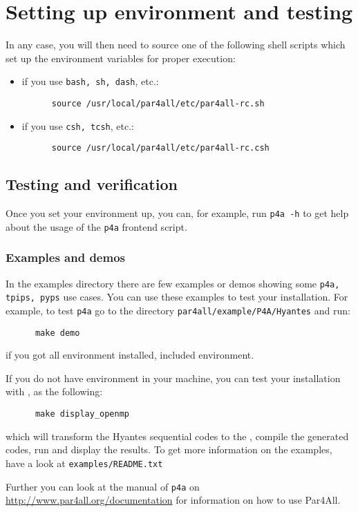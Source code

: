 \documentclass[a4paper]{article}
\begin{document}
\section{Setting up environment and testing \protect\Apfa}
\label{sec:testing}

In any case, you will then need to source one of the following shell
scripts which set up the environment variables for proper \Apfa
execution:
\begin{itemize}
\item if you use \texttt{bash, sh, dash}, etc.:
\begin{verbatim}
      source /usr/local/par4all/etc/par4all-rc.sh
\end{verbatim}
\item if you use \texttt{csh, tcsh}, etc.:
\begin{verbatim}
      source /usr/local/par4all/etc/par4all-rc.csh
\end{verbatim}
\end{itemize}

\subsection{Testing and verification}

Once you set your environment up, you can, for example, run \texttt{p4a -h}
to get help about the usage of the \texttt{p4a} frontend script.

\subsubsection{Examples and demos}

In the examples directory there are few examples or demos showing some \texttt{p4a,
tpips, pyps} use cases. You can use these examples to test your installation.
For example, to test \texttt{p4a} go to the directory \texttt{par4all/example/P4A/Hyantes}
and run:
\begin{verbatim}
      make demo
\end{verbatim}
if you got all environment installed, included \Acuda environment.

If you do not have \Acuda environment in your machine, you can test your installation with
\Aopenmp, as the following:
\begin{verbatim}
      make display_openmp
\end{verbatim}
which will transform the Hyantes sequential codes to the \Aopenmp, compile the generated codes,
run and display the results.
To get more information on the examples, have a look at \texttt{examples/README.txt}

Further you can look at the manual of \texttt{p4a} on
\url{http://www.par4all.org/documentation} for information on how to use Par4All.
\end{document}
